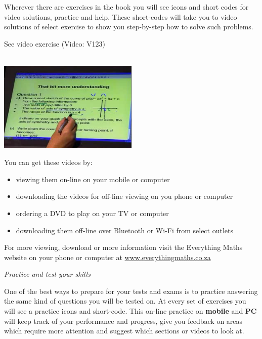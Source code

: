 {\Large

Wherever there are exercises in the book you will see icons and short codes for video solutions,
practice and help. These short-codes will take you to video solutions of select exercise to show you
step-by-step how to solve such problems. \par

\begin{center}
\caption{See video exercise  (Video: V123)} \\
\includegraphics[width=0.5\textwidth]{title_images/mindsetexercise.png}
\end{center}
\par
You can get these videos by:
\begin{itemize}
    \item viewing them on-line on your mobile or computer
    \item downloading the videos for off-line viewing on you phone or computer
    \item ordering a DVD to play on your TV or computer
    \item downloading them off-line over Bluetooth or Wi-Fi from select outlets
\end{itemize}



\newpage
\thispagestyle{empty}
{\Large

For more viewing, download or more information visit the Everything Maths website on your phone or
computer at \underline{www.everythingmaths.co.za}  \par
\vspace*{1cm}
{\normalfont\sffamily\fontsize{22}\normalfont\itshape Practice and test your skills} \par


One of the best ways to prepare for your tests and exams is to practice answering the same kind of
questions you will be tested on. At every set of exercises you will see a practice icons and short-code.
This on-line practice on \textbf{mobile} and \textbf{PC} will keep track of your performance and progress, give you
feedback on areas which require more attention and suggest which sections or videos to look at.

}}
